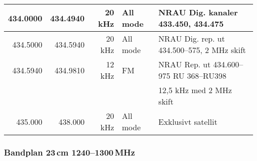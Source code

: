 \begin{tabular}{rrrll}
	434.0000 & 434.4940 & 20 kHz  & All mode     & NRAU Dig. kanaler 433.450, 434.475                \\ \hline
	434.5000 & 434.5940 & 20 kHz  & All mode     & NRAU Dig. rep. ut 434.500--575, 2 MHz skift       \\ \hline
	434.5940 & 434.9810 & 12 kHz  & FM           & NRAU Rep. ut 434.600--975 RU 368--RU398           \\
	&          &         &              & 12,5 kHz med 2 MHz skift                          \\ \hline
	435.000  & 438.000  & 20 kHz  & All mode     & Exklusivt satellit\\
\end{tabular}

\subsubsection{Bandplan 23\,cm 1240--1300\,MHz}
